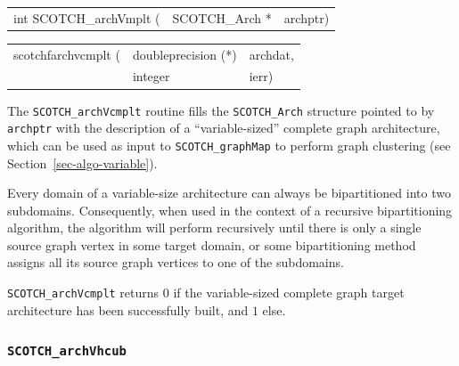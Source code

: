 \begin{itemize}
\progsyn

{\tt\begin{tabular}{l@{}ll}
int SCOTCH\_archVmplt ( & SCOTCH\_Arch * & archptr)
\end{tabular}}

{\tt\begin{tabular}{l@{}ll}
scotchfarchvcmplt ( & doubleprecision (*) & archdat, \\
                    & integer             & ierr)
\end{tabular}}

\progdes

The {\tt SCOTCH\_archVcmplt} routine fills the {\tt SCOTCH\_\lbt Arch}
structure pointed to by {\tt archptr} with the description of a
``variable-sized'' complete graph architecture, which can be used as
input to {\tt SCOTCH\_\lbt graph\lbt Map} to perform graph clustering
(see Section~\ref{sec-algo-variable}).

Every domain of a variable-size architecture can always be
bipartitioned into two subdomains. Consequently, when used in the
context of a recursive bipartitioning algorithm, the algorithm will
perform recursively until there is only a single source graph vertex
in some target domain, or some bipartitioning method assigns all its
source graph vertices to one of the subdomains.

\progret

{\tt SCOTCH\_archVcmplt} returns $0$ if the variable-sized complete
graph target architecture has been successfully built, and $1$ else.
\end{itemize}

\subsubsection{{\tt SCOTCH\_archVhcub}}

